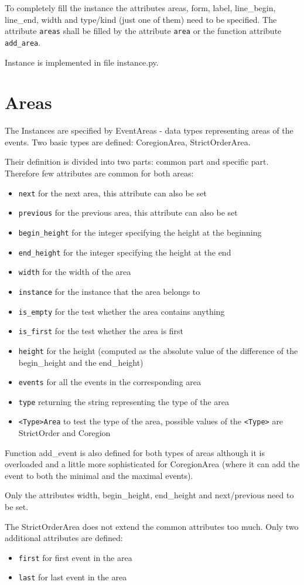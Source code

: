\documentclass[11pt,oneside]{fithesis2}
\newcommand{\T}[1]{\texttt{#1}}
\newcommand{\ite}[1]{\item{\texttt{#1}}}
\begin{document}
To completely fill the instance the attributes areas, form, label, line\_begin, line\_end, width and type/kind (just one of them) need to be specified. The attribute \texttt{areas} shall be filled by the attribute \texttt{area} or the function attribute \texttt{add\_area}.

Instance is implemented in file instance.py.


\section{Areas}
The Instances are specified by EventAreas - data types representing areas of the events. Two basic types are defined: CoregionArea, StrictOrderArea.

Their definition is divided into two parts: common part and specific part. Therefore few attributes are common for both areas:
\begin{itemize}
\ite{next} for the next area, this attribute can also be set
\ite{previous} for the previous area, this attribute can also be set
\ite{begin\_height} for the integer specifying the height at the beginning
\ite{end\_height} for the integer specifying the height at the end
\ite{width} for the width of the area
\ite{instance} for the instance that the area belongs to
\ite{is\_empty} for the test whether the area contains anything
\ite{is\_first} for the test whether the area is first
\ite{height} for the height (computed as the absolute value of the difference of the begin\_height and the end\_height)
\ite{events} for all the events in the corresponding area
\ite{type} returning the string representing the type of the area
\ite{<Type>Area} to test the type of the area, possible values of the \T{<Type>} are StrictOrder and Coregion
\end{itemize}

Function add\_event is also defined for both types of areas although it is overloaded and a little more sophisticated for CoregionArea (where it can add the event to both the minimal and the maximal events).

Only the attributes width, begin\_height, end\_height and next/previous need to be set.

The StrictOrderArea does not extend the common attributes too much. Only two additional attributes are defined:
\begin{itemize}
\ite{first} for first event in the area
\ite{last} for last event in the area
\end{itemize}
\end{document}
